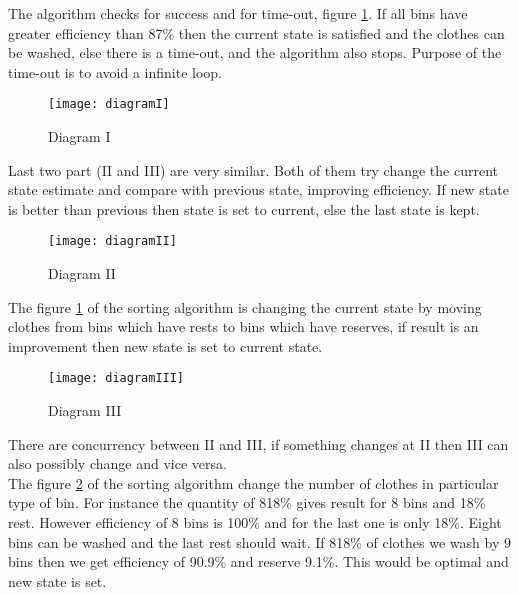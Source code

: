 The algorithm checks for success and for time-out, figure \ref{fig:diagramI}. If all bins have greater efficiency than 87\% then the current state is satisfied and the clothes can be washed, else there is a time-out, and the algorithm also stops. Purpose of the time-out is to avoid a infinite loop.

\begin{figure}[h]
	\centering
		\texttt{[image: diagramI]}
	\caption{Diagram I}
	\label{fig:diagramI}
\end{figure}

Last two part (II and III) are very similar. Both of them try change the current state estimate and compare with previous state, improving efficiency. If new state is better than previous then state is set to current, else the last state is kept.  \newpage

\begin{figure}[h]
	\centering
		\texttt{[image: diagramII]}
	\caption{Diagram II}
	\label{fig:diagramII}
\end{figure}

The figure \ref{fig:diagramI} of the sorting algorithm is changing the current state by moving clothes from bins which have rests to bins which have reserves, if result is an improvement then new state is set to current state. 

\begin{figure}[h]
	\centering
		\texttt{[image: diagramIII]}
	\caption{Diagram III}
	\label{fig:diagramIII}
\end{figure}
There are concurrency between II and III, if something changes at II then III can also possibly change and vice versa.
\\
The figure \ref{fig:diagramII} of the sorting algorithm change the number of clothes in particular type of bin. For instance the quantity of 818\% gives result for 8 bins and 18\% rest. However efficiency of 8 bins is 100\% and for the last one is only 18\%. Eight bins can be washed and the last rest should wait. If 818\% of clothes we wash by 9 bins then we get efficiency of 90.9\% and reserve 9.1\%. This would be optimal and new state is set.

